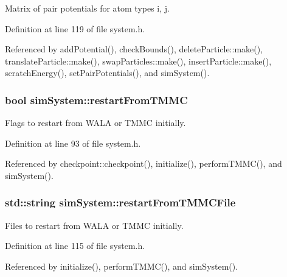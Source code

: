 Matrix of pair potentials for atom types i, j. 



Definition at line 119 of file system.\-h.



Referenced by add\-Potential(), check\-Bounds(), delete\-Particle\-::make(), translate\-Particle\-::make(), swap\-Particles\-::make(), insert\-Particle\-::make(), scratch\-Energy(), set\-Pair\-Potentials(), and sim\-System().

\hypertarget{classsim_system_a0c81d3b606c070c801f8d86288e44391}{
\subsubsection[{restart\-From\-T\-M\-M\-C}]{\setlength{\rightskip}{0pt plus 5cm}bool sim\-System\-::restart\-From\-T\-M\-M\-C}}\label{classsim_system_a0c81d3b606c070c801f8d86288e44391}


Flags to restart from W\-A\-L\-A or T\-M\-M\-C initially. 



Definition at line 93 of file system.\-h.



Referenced by checkpoint\-::checkpoint(), initialize(), perform\-T\-M\-M\-C(), and sim\-System().

\hypertarget{classsim_system_a5ccdad82b3767ba21b1e4b1e36362082}{
\subsubsection[{restart\-From\-T\-M\-M\-C\-File}]{\setlength{\rightskip}{0pt plus 5cm}std\-::string sim\-System\-::restart\-From\-T\-M\-M\-C\-File}}\label{classsim_system_a5ccdad82b3767ba21b1e4b1e36362082}


Files to restart from W\-A\-L\-A or T\-M\-M\-C initially. 



Definition at line 115 of file system.\-h.



Referenced by initialize(), perform\-T\-M\-M\-C(), and sim\-System().

